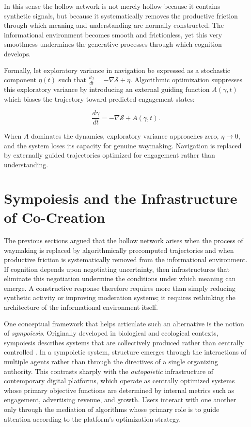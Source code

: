 \documentclass[12pt,a4paper]{article}
\begin{document}
In this sense the hollow network is not merely hollow because it contains synthetic signals,
but because it systematically removes the productive friction through which meaning and
understanding are normally constructed. The informational environment becomes smooth and
frictionless, yet this very smoothness undermines the generative processes through which
cognition develops.

Formally, let exploratory variance in navigation be expressed as a stochastic component
$\eta(t)$ such that $\frac{d\gamma}{dt} = -\nabla\mathcal{S} + \eta$. Algorithmic optimization
suppresses this exploratory variance by introducing an external guiding function $A(\gamma,t)$
which biases the trajectory toward predicted engagement states:

\[
\frac{d\gamma}{dt} = -\nabla\mathcal{S} + A(\gamma,t).
\]

When $A$ dominates the dynamics, exploratory variance approaches zero, $\eta \to 0$, and the
system loses its capacity for genuine waymaking. Navigation is replaced by externally guided
trajectories optimized for engagement rather than understanding.

\section{Sympoiesis and the Infrastructure of Co-Creation}

The previous sections argued that the hollow network arises when the process of waymaking is
replaced by algorithmically precomputed trajectories and when productive friction is
systematically removed from the informational environment. If cognition depends upon
negotiating uncertainty, then infrastructures that eliminate this negotiation undermine the
conditions under which meaning can emerge. A constructive response therefore requires more
than simply reducing synthetic activity or improving moderation systems; it requires
rethinking the architecture of the informational environment itself.

One conceptual framework that helps articulate such an alternative is the notion of
\emph{sympoiesis}. Originally developed in biological and ecological contexts, sympoiesis
describes systems that are collectively produced rather than centrally controlled \citep{boyd2014}.
In a sympoietic system, structure emerges through the interactions of multiple agents rather
than through the directives of a single organizing authority. This contrasts sharply with the
\emph{autopoietic} infrastructure of contemporary digital platforms, which operate as
centrally optimized systems whose primary objective functions are determined by internal
metrics such as engagement, advertising revenue, and growth. Users interact with one another
only through the mediation of algorithms whose primary role is to guide attention according
to the platform's optimization strategy.
\end{document}
